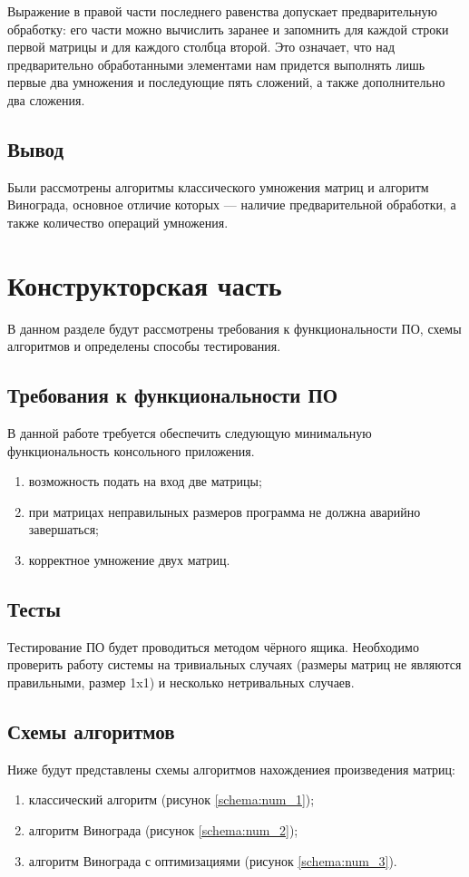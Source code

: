 \documentclass[utf8x, 12pt]{G7-32}
\begin{document}
Выражение в правой части последнего равенства допускает предварительную обработку: его части можно вычислить заранее и запомнить для каждой строки первой матрицы и для каждого столбца второй. 
Это означает, что над предварительно обработанными элементами нам придется выполнять лишь первые два умножения и последующие пять сложений, а также дополнительно два сложения. 

\section{Вывод}
Были рассмотрены алгоритмы классического умножения матриц и алгоритм Винограда, основное отличие которых — наличие предварительной обработки, а также количество операций умножения.




\chapter{Конструкторская часть}
    В данном разделе будут рассмотрены требования к функциональности ПО, схемы алгоритмов
    и определены способы тестирования.

    \section{Требования к функциональности ПО}
        В данной работе требуется обеспечить следующую минимальную функциональность консольного приложения.
            \begin{enumerate}
                \item возможность подать на вход две матрицы;
                \item при матрицах неправилыных размеров программа не должна аварийно завершаться;
		\item корректное умножение двух матриц.
            \end{enumerate}
\section{Тесты}
    Тестирование ПО будет проводиться методом чёрного ящика. Необходимо проверить работу системы 
    на тривиальных случаях (размеры матриц не являются правильными, размер 1x1) 
    и несколько нетривальных случаев.

    \section{Схемы алгоритмов}
        Ниже будут представлены схемы алгоритмов нахождениея произведения матриц: \begin{enumerate}
            \item классический алгоритм (рисунок \ref{schema:num_1});
            \item алгоритм Винограда (рисунок \ref{schema:num_2});
            \item алгоритм Винограда с оптимизациями (рисунок \ref{schema:num_3}).
        \end{enumerate}
\end{document}
